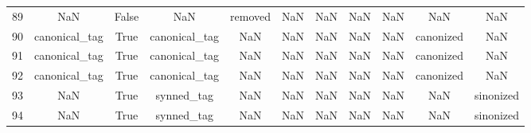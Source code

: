 \begin{table}[h!]
{\begin{tabular}{|c|c|c|c|c|c|c|c|c|c|c|}
         89 &                       NaN &                             False &                          NaN &                              removed &                                  NaN &                                  NaN &                                  NaN &                                  NaN &                                  NaN &                                                NaN \\
         90 &             canonical\_tag &                              True &                canonical\_tag &                                  NaN &                                  NaN &                                  NaN &                                  NaN &                                  NaN &                            canonized &                                                NaN \\
         91 &             canonical\_tag &                              True &                canonical\_tag &                                  NaN &                                  NaN &                                  NaN &                                  NaN &                                  NaN &                            canonized &                                                NaN \\
         92 &             canonical\_tag &                              True &                canonical\_tag &                                  NaN &                                  NaN &                                  NaN &                                  NaN &                                  NaN &                            canonized &                                                NaN \\
         93 &                       NaN &                              True &                   synned\_tag &                                  NaN &                                  NaN &                                  NaN &                                  NaN &                                  NaN &                                  NaN &                                          sinonized \\
         94 &                       NaN &                              True &                   synned\_tag &                                  NaN &                                  NaN &                                  NaN &                                  NaN &                                  NaN &                                  NaN &                                          sinonized \\

\end{tabular}}
\end{table}
